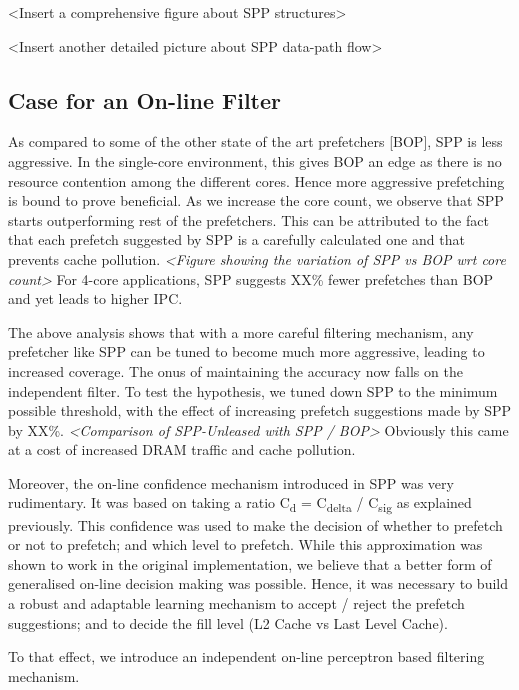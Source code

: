 <Insert a comprehensive figure about SPP structures>

<Insert another detailed picture about SPP data-path flow>

\subsection{Case for an On-line Filter}
\label{Background-Case}
As compared to some of the other state of the art prefetchers [BOP], SPP is
less aggressive.  In the single-core environment, this gives BOP an edge as
there is no resource contention among the different cores.  Hence more
aggressive prefetching is bound to prove beneficial.  As we increase the core
count, we observe that SPP starts outperforming rest of the prefetchers.  This
can be attributed to the fact that each prefetch suggested by SPP is a
carefully calculated one and that prevents cache pollution.  \textit{<Figure
showing the variation of SPP vs BOP wrt core count>} For 4-core applications,
SPP suggests XX\% fewer prefetches than BOP and yet leads to higher IPC.

The above analysis shows that with a more careful filtering mechanism, any
prefetcher like SPP can be tuned to become much more aggressive, leading to
increased coverage.  The onus of maintaining the accuracy now falls on the
independent filter.  To test the hypothesis, we tuned down SPP to the
minimum possible threshold, with the effect of increasing prefetch suggestions
made by SPP by XX\%.  \textit{<Comparison of SPP-Unleased with SPP / BOP>}
Obviously this came at a cost of increased DRAM traffic and cache pollution.

Moreover, the on-line confidence mechanism introduced in SPP was very
rudimentary.  It was based on taking a ratio C\textsubscript{d} =
C\textsubscript{delta} / C\textsubscript{sig} as explained previously. This
confidence was used to make the decision of whether to prefetch or not to
prefetch; and which level to prefetch.  While this approximation was shown to
work in the original implementation, we believe that a better form of
generalised on-line decision making was possible.  Hence, it was necessary to
build a robust and adaptable learning mechanism to accept / reject the
prefetch suggestions; and to decide the fill level (L2 Cache vs Last Level
Cache).

To that effect, we introduce an independent on-line perceptron based
filtering mechanism.
